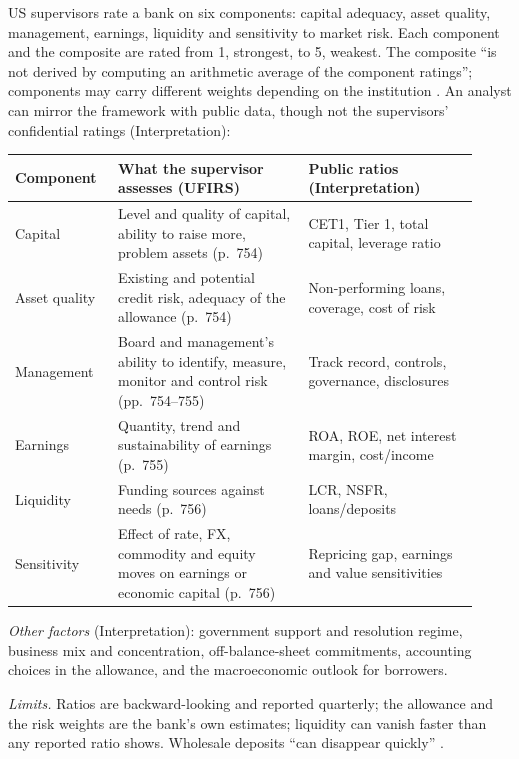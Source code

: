 \begin{qfmethod}\label{meth:bank-camels-analysis}
 US supervisors rate a bank on six components: capital adequacy, asset quality, management, earnings, liquidity and sensitivity to market risk. Each component and the composite are rated from 1, strongest, to 5, weakest. The composite ``is not derived by computing an arithmetic average of the component ratings''; components may carry different weights depending on the institution \citep[pp.~752--753]{fdic-ufirs-1997}. An analyst can mirror the framework with public data, though not the supervisors' confidential ratings (Interpretation):
\begin{center}\small
\begin{tabular}{@{}p{0.2\linewidth}p{0.38\linewidth}p{0.34\linewidth}@{}}
\toprule
Component & What the supervisor assesses (UFIRS) & Public ratios (Interpretation) \\
\midrule
Capital & Level and quality of capital, ability to raise more, problem assets (p.~754) & CET1, Tier 1, total capital, leverage ratio \\
Asset quality & Existing and potential credit risk, adequacy of the allowance (p.~754) & Non-performing loans, coverage, cost of risk \\
Management & Board and management's ability to identify, measure, monitor and control risk (pp.~754--755) & Track record, controls, governance, disclosures \\
Earnings & Quantity, trend and sustainability of earnings (p.~755) & ROA, ROE, net interest margin, cost/income \\
Liquidity & Funding sources against needs (p.~756) & LCR, NSFR, loans/deposits \\
Sensitivity & Effect of rate, FX, commodity and equity moves on earnings or economic capital (p.~756) & Repricing gap, earnings and value sensitivities \\
\bottomrule
\end{tabular}
\end{center}
\emph{Other factors} (Interpretation): government support and resolution regime, business mix and concentration, off-balance-sheet commitments, accounting choices in the allowance, and the macroeconomic outlook for borrowers.

\emph{Limits.} Ratios are backward-looking and reported quarterly; the allowance and the risk weights are the bank's own estimates; liquidity can vanish faster than any reported ratio shows. Wholesale deposits ``can disappear quickly'' \citep[pp.~459--460]{risk-management-financial-institutions-2023}.


\end{qfmethod}
